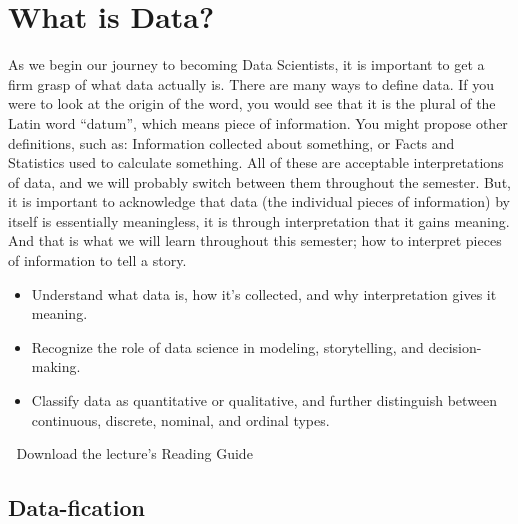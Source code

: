 \documentclass[
  letterpaper,
  DIV=11,
  numbers=noendperiod]{scrreprt}
\providecommand{\tightlist}{%
  \setlength{\itemsep}{0pt}\setlength{\parskip}{0pt}}
\begin{document}

\chapter{What is Data?}\label{what-is-data}

As we begin our journey to becoming Data Scientists, it is important to
get a firm grasp of what data actually is. There are many ways to define
data. If you were to look at the origin of the word, you would see that
it is the plural of the Latin word ``datum'', which means piece of
information. You might propose other definitions, such as: Information
collected about something, or Facts and Statistics used to calculate
something. All of these are acceptable interpretations of data, and we
will probably switch between them throughout the semester. But, it is
important to acknowledge that data (the individual pieces of
information) by itself is essentially meaningless, it is through
interpretation that it gains meaning. And that is what we will learn
throughout this semester; how to interpret pieces of information to tell
a story.

\begin{itemize}
\tightlist
\item
  Understand what data is, how it's collected, and why interpretation
  gives it meaning.
\item
  Recognize the role of data science in modeling, storytelling, and
  decision-making.
\item
  Classify data as quantitative or qualitative, and further distinguish
  between continuous, discrete, nominal, and ordinal types.
\end{itemize}

\begin{tcolorbox}[enhanced jigsaw, colframe=quarto-callout-tip-color-frame, colback=white, breakable, rightrule=.15mm, title=\textcolor{quarto-callout-tip-color}{\faLightbulb}\hspace{0.5em}{Supplemental Material}, bottomtitle=1mm, toptitle=1mm, titlerule=0mm, left=2mm, coltitle=black, colbacktitle=quarto-callout-tip-color!10!white, leftrule=.75mm, opacitybacktitle=0.6, bottomrule=.15mm, opacityback=0, arc=.35mm, toprule=.15mm]

📄 Download the lecture's Reading Guide

\end{tcolorbox}

\section{Data-fication}\label{data-fication}
\end{document}
